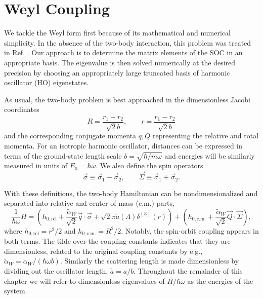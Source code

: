 \section{\label{sec:Weyl}Weyl Coupling}
We tackle the Weyl form first because of its mathematical and numerical simplicity. In the absence of the two-body interaction, this problem was treated in Ref. \cite{anderson2013}. Our approach is to determine the matrix elements of the SOC in an appropriate basis. The eigenvalue is then solved numerically at the desired precision by choosing an appropriately large truncated basis of harmonic oscillator (HO) eigenstates.

As usual, the two-body problem is best approached in the dimensionless Jacobi coordinates
\begin{equation}
R=\frac{r_1+r_2}{\sqrt{2}b}, \qquad r=\frac{r_1-r_2}{\sqrt{2}b}
\end{equation}
and the corresponding conjugate momenta $q,Q$ representing the relative and total momenta. For an isotropic harmonic oscillator, distances can be expressed in terms of the ground-state length scale $b=\sqrt{\hbar/m\omega}$ and energies will be similarly measured in units of $E_0=\hbar\omega$. We also define the spin operators
\begin{equation}
\vec{\sigma}\equiv\vec{\sigma}_1-\vec{\sigma}_2, \qquad \vec{\Sigma}\equiv\vec{\sigma}_1+\vec{\sigma}_2.
\end{equation}

With these definitions, the two-body Hamiltonian can be nondimensionalized and separated into relative and center-of-mass (c.m.) parts,
\begin{equation}\label{eq:WeylHamiltonian}
\frac{1}{\hbar\omega}H=\left(h_{0,\text{rel}}+\frac{\tilde{\alpha}_W}{\sqrt{2}} \vec{q}\cdot\vec{\sigma} + \sqrt{2}\pi \tilde{a}(\Lambda) \delta^{(3)}(r)\right)+\left(h_{0,\text{c.m.}}+\frac{\tilde{\alpha}_W}{\sqrt{2}} \vec{Q}\cdot\vec{\Sigma} \right),
\end{equation}
where $h_{0,\text{rel}}=r^2/2$ and $h_{0,\text{c.m.}}=R^2/2$. Notably, the spin-orbit coupling appears in both terms.  The tilde over the coupling constants indicates that they are dimensionless, related to the original coupling constants by e.g., $\tilde{\alpha}_W=\alpha_W/(\hbar\omega b)$. Similarly the scattering length is made dimensionless by dividing out the oscillator length, $\tilde{a}=a/b$. Throughout the remainder of this chapter we will refer to dimensionless eigenvalues of $H/\hbar\omega$ as the energies of the system.


